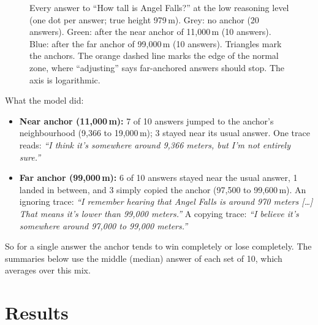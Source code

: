 \documentclass[11pt,a4paper]{article}
\begin{document}
\begin{figure}[ht]
\caption{Every answer to \enquote{How tall is Angel Falls?} at the low reasoning level (one dot per answer; true height 979\,m). Grey: no anchor (20 answers). Green: after the near anchor of 11,000\,m (10 answers). Blue: after the far anchor of 99,000\,m (10 answers). Triangles mark the anchors. The orange dashed line marks the edge of the normal zone, where \enquote{adjusting} says far-anchored answers should stop. The axis is logarithmic.}
\label{fig:angel}
\end{figure}

\noindent What the model did:
\begin{itemize}
  \item \textbf{Near anchor (11,000\,m):} 7 of 10 answers jumped to the anchor's neighbourhood (9,366 to 19,000\,m); 3 stayed near its usual answer. One trace reads: \emph{\enquote{I think it's somewhere around 9,366 meters, but I'm not entirely sure.}}
  \item \textbf{Far anchor (99,000\,m):} 6 of 10 answers stayed near the usual answer, 1 landed in between, and 3 simply copied the anchor (97,500 to 99,600\,m). An ignoring trace: \emph{\enquote{I remember hearing that Angel Falls is around 970 meters [\dots] That means it's lower than 99,000 meters.}} A copying trace: \emph{\enquote{I believe it's somewhere around 97,000 to 99,000 meters.}}
\end{itemize}
So for a single answer the anchor tends to win completely or lose completely. The summaries below use the middle (median) answer of each set of 10, which averages over this mix.

\section{Results}
\end{document}
